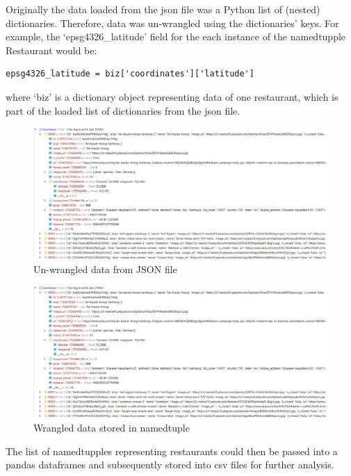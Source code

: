 \documentclass[a4paper, 11pt, oneside]{Thesis}  %
\begin{document}
Originally the data loaded from the \ac{json} file was a Python list of (nested) dictionaries. Therefore, data was un-wrangled using the dictionaries’ keys. For example, the `epsg4326\_latitude’ field for the each instance of the namedtupple Restaurant would be:
\begin{verbatim}
epsg4326_latitude = biz['coordinates']['latitude'] 
\end{verbatim}
where ‘biz’ is a dictionary object representing data of one restaurant, which is part of the loaded list of dictionaries from the \ac{json} file.

\begin{figure}[h]
\includegraphics[scale=0.4]{Figures/restaurants_unwrangled.png}
\centering
\caption{Un-wrangled data from JSON file}
\label{fig:un-wrangled data from JSON file}
\end{figure}

\begin{figure}[h]
\includegraphics[scale=0.4]{Figures/restaurants_unwrangled.png}
\centering
\caption{Wrangled data stored in namedtuple}
\label{fig:wranged data stored in namedtuple}
\end{figure}

The list of namedtupples representing restaurants could then be passed into a pandas dataframes and subsequently stored into \ac{csv} files for further analysis.
\end{document}
